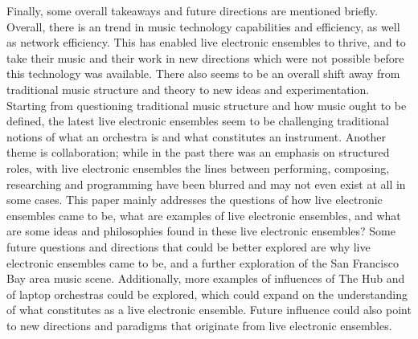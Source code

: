 \documentclass[letterpaper, 12pt]{article}
\begin{document}
%
Finally, some overall takeaways and future directions are mentioned briefly.
%
Overall, there is an trend in music technology capabilities and efficiency, as well as network efficiency.
%
This has enabled live electronic ensembles to thrive, and to take their music and their work in new directions which were not possible before this technology was available.
%
There also seems to be an overall shift away from traditional music structure and theory to new ideas and experimentation.
%
Starting from questioning traditional music structure and how music ought to be defined, the latest live electronic ensembles seem to be challenging traditional notions of what an orchestra is and what constitutes an instrument.
%
Another theme is collaboration; while in the past there was an emphasis on structured roles, with live electronic ensembles the lines between performing, composing, researching and programming have been blurred and may not even exist at all in some cases.
%
This paper mainly addresses the questions of how live electronic ensembles came to be, what are examples of live electronic ensembles, and what are some ideas and philosophies found in these live electronic ensembles?
%
Some future questions and directions that could be better explored are why live electronic ensembles came to be, and a further exploration of the San Francisco Bay area music scene.
%
Additionally, more examples of influences of The Hub and of laptop orchestras could be explored, which could expand on the understanding of what constitutes as a live electronic ensemble.
%
Future influence could also point to new directions and paradigms that originate from live electronic ensembles.


% 

\newpage



\end{document}
